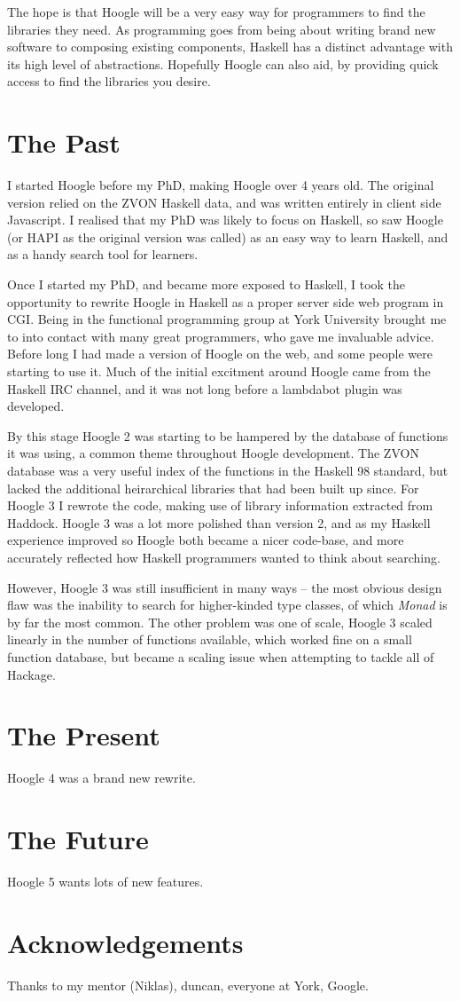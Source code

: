 \documentclass{tmr}
\begin{document}
The hope is that Hoogle will be a very easy way for programmers to find the libraries they need. As programming goes from being about writing brand new software to composing existing components, Haskell has a distinct advantage with its high level of abstractions. Hopefully Hoogle can also aid, by providing quick access to find the libraries you desire.

\section{The Past}

I started Hoogle before my PhD, making Hoogle over 4 years old. The original version relied on the ZVON Haskell data, and was written entirely in client side Javascript. I realised that my PhD was likely to focus on Haskell, so saw Hoogle (or HAPI as the original version was called) as an easy way to learn Haskell, and as a handy search tool for learners.

Once I started my PhD, and became more exposed to Haskell, I took the opportunity to rewrite Hoogle in Haskell as a proper server side web program in CGI. Being in the functional programming group at York University brought me to into contact with many great programmers, who gave me invaluable advice. Before long I had made a version of Hoogle on the web, and some people were starting to use it. Much of the initial excitment around Hoogle came from the Haskell IRC channel, and it was not long before a lambdabot plugin was developed.

By this stage Hoogle 2 was starting to be hampered by the database of functions it was using, a common theme throughout Hoogle development. The ZVON database was a very useful index of the functions in the Haskell 98 standard, but lacked the additional heirarchical libraries that had been built up since. For Hoogle 3 I rewrote the code, making use of library information extracted from Haddock. Hoogle 3 was a lot more polished than version 2, and as my Haskell experience improved so Hoogle both became a nicer code-base, and more accurately reflected how Haskell programmers wanted to think about searching.

However, Hoogle 3 was still insufficient in many ways -- the most obvious design flaw was the inability to search for higher-kinded type classes, of which \textit{Monad} is by far the most common. The other problem was one of scale, Hoogle 3 scaled linearly in the number of functions available, which worked fine on a small function database, but became a scaling issue when attempting to tackle all of Hackage.

\section{The Present}

Hoogle 4 was a brand new rewrite.

\section{The Future}

Hoogle 5 wants lots of new features.


\section{Acknowledgements}

Thanks to my mentor (Niklas), duncan, everyone at York, Google.



\end{document}
